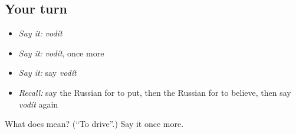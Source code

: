 \subsection*{Your turn}
\begin{itemize}
\raggedright
  \item \emph{Say it:} \emph{vodít}
  \item \emph{Say it:} \emph{vodít}, once more
  \item \emph{Say it:} say \emph{vodít}
  \item \emph{Recall:} say the Russian for to put, then the Russian for to believe, then say \emph{vodít} again
\end{itemize}

\begin{tcolorbox}[breakable,colback=teal!4,colframe=teal!35!black,title={Before you move on}]
What does  mean? (\textquotedblleft{}To drive\textquotedblright{}.) Say it once more.
\end{tcolorbox}
